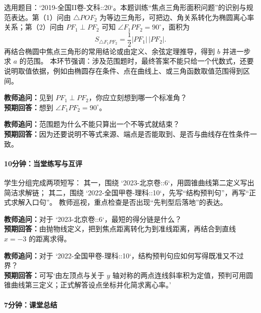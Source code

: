 \documentclass[UTF8,a4paper,11pt]{ctexart}
\begin{document}
选用题目：`2019-全国II卷-文科::20`。本题训练“焦点三角形面积问题”的识别与规范表达。第（1）问由 $\triangle POF_2$ 为等边三角形，可把边、角关系转化为椭圆离心率关系；第（2）问由 $PF_1\perp PF_2$ 可知 $\angle F_1PF_2=90^\circ$，面积为
\[
S_{\triangle F_1PF_2}=\frac12|PF_1|\,|PF_2|.
\]
再结合椭圆中焦点三角形的常用结论或由定义、余弦定理推导，得到 $b$ 并进一步求 $a$ 的范围。
本环节强调：涉及范围题时，最终答案不能只给一个代数式，还要说明取值依据，例如由椭圆存在条件、点在曲线上、或三角函数取值范围得到区间。

\noindent\textbf{教师追问：}见到 $PF_1\perp PF_2$，你应立刻想到哪一个标准角？\\

\textbf{预期回答：}想到 $\angle F_1PF_2=90^\circ$。\par

\noindent\textbf{教师追问：}范围题为什么不能只算出一个不等式就结束？\\

\textbf{预期回答：}因为还要说明不等式来源、端点是否能取到、是否与曲线存在性条件一致。\par

\paragraph{10分钟：当堂练写与互评}

学生分组完成两项短写：
其一，围绕 `2023-北京卷::6`，用圆锥曲线第二定义写出简洁求解链；
其二，围绕 `2022-全国甲卷-理科::10`，先写“结构预判句”，再写“正式求解入口句”。
教师巡视，重点检查是否出现“先判型后落地”的表达。

\noindent\textbf{教师追问：}对于 `2023-北京卷::6`，最短的得分链是什么？\\

\textbf{预期回答：}由抛物线定义，把到焦点距离转化为到准线距离，再结合到直线 $x=-3$ 的距离求得。\par

\noindent\textbf{教师追问：}对于 `2022-全国甲卷-理科::10`，结构预判句应如何写得既准又不过界？\\

\textbf{预期回答：}可写‘由左顶点与关于 $y$ 轴对称的两点连线斜率积为定值，预判可用圆锥曲线第三定义；正式解答设点坐标并化简求离心率。’\par

\paragraph{7分钟：课堂总结}
\end{document}
